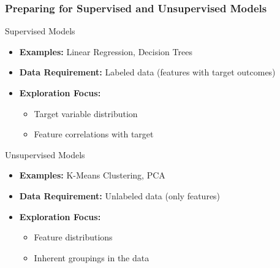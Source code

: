 \documentclass[aspectratio=169]{beamer}
\begin{document}
\begin{frame}[fragile]
    \frametitle{Preparing for Supervised and Unsupervised Models}
    \begin{block}{Supervised Models}
        \begin{itemize}
            \item \textbf{Examples:} Linear Regression, Decision Trees
            \item \textbf{Data Requirement:} Labeled data (features with target outcomes)
            \item \textbf{Exploration Focus:}
            \begin{itemize}
                \item Target variable distribution
                \item Feature correlations with target
            \end{itemize}
        \end{itemize}
    \end{block}
    
    \begin{block}{Unsupervised Models}
        \begin{itemize}
            \item \textbf{Examples:} K-Means Clustering, PCA
            \item \textbf{Data Requirement:} Unlabeled data (only features)
            \item \textbf{Exploration Focus:}
            \begin{itemize}
                \item Feature distributions
                \item Inherent groupings in the data
            \end{itemize}
        \end{itemize}
    \end{block}
\end{frame}
\end{document}
